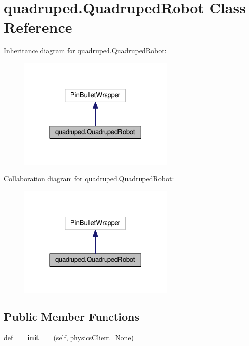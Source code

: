 \hypertarget{classquadruped_1_1QuadrupedRobot}{}\section{quadruped.\+Quadruped\+Robot Class Reference}
\label{classquadruped_1_1QuadrupedRobot}


Inheritance diagram for quadruped.\+Quadruped\+Robot\+:
\nopagebreak
\begin{figure}[H]
\begin{center}
\leavevmode
\includegraphics[width=218pt]{classquadruped_1_1QuadrupedRobot__inherit__graph}
\end{center}
\end{figure}


Collaboration diagram for quadruped.\+Quadruped\+Robot\+:
\nopagebreak
\begin{figure}[H]
\begin{center}
\leavevmode
\includegraphics[width=218pt]{classquadruped_1_1QuadrupedRobot__coll__graph}
\end{center}
\end{figure}
\subsection*{Public Member Functions}
\begin{DoxyCompactItemize}
\item 
def {\bfseries \+\_\+\+\_\+init\+\_\+\+\_\+} (self, physics\+Client=None)\hypertarget{classquadruped_1_1QuadrupedRobot_acd22d681511fc02910f6dd168f3e6305}{}\label{classquadruped_1_1QuadrupedRobot_acd22d681511fc02910f6dd168f3e6305}

\end{DoxyCompactItemize}
